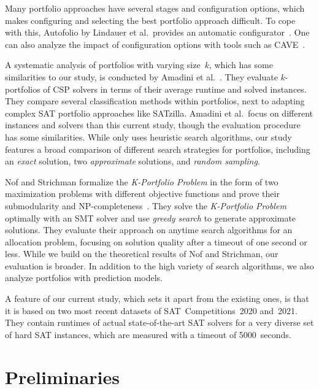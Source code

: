 \documentclass[conference]{IEEEtran}
\begin{document}
Many portfolio approaches have several stages and configuration options, which makes configuring and selecting the best portfolio approach difficult.
To cope with this, Autofolio by Lindauer et al.\ provides an automatic configurator~\cite{lindauer2015autofolio}.
One can also analyze the impact of configuration options with tools such as CAVE~\cite{biedenkapp2018cave}.

A systematic analysis of portfolios with varying size~$k$, which has some similarities to our study, is conducted by Amadini et al.~\cite{amadini2014empirical, amadini2016extensive}.
They evaluate $k$-portfolios of CSP solvers in terms of their average runtime and solved instances. 
They compare several classification methods within portfolios, next to adapting complex SAT portfolio approaches like SATzilla. 
Amadini et al.\ focus on different instances and solvers than this current study, though the evaluation procedure has some similarities.
While \cite{amadini2014empirical} only uses heuristic search algorithms, our study features a broad comparison of different search strategies for portfolios, including an \emph{exact} solution, two \emph{approximate} solutions, and \emph{random sampling}. 

Nof and Strichman formalize the \emph{K-Portfolio Problem} in the form of two maximization problems with different objective functions and prove their submodularity and NP-completeness~\cite{nof2020real}. 
They solve the \emph{K-Portfolio Problem} optimally with an SMT solver and use \emph{greedy search} to generate approximate solutions.
They evaluate their approach on anytime search algorithms for an allocation problem, focusing on solution quality after a timeout of one second or less. 
While we build on the theoretical results of Nof and Strichman, our evaluation is broader. 
In addition to the high variety of search algorithms, we also analyze portfolios with prediction models.

A feature of our current study, which sets it apart from the existing ones, is that it is based on two most recent datasets of SAT~Competitions~2020 and~2021. 
They contain runtimes of actual state-of-the-art SAT solvers for a very diverse set of hard SAT instances, which are measured with a timeout of 5000~seconds.

\section{Preliminaries}
\label{sec:preliminaries}
\end{document}
